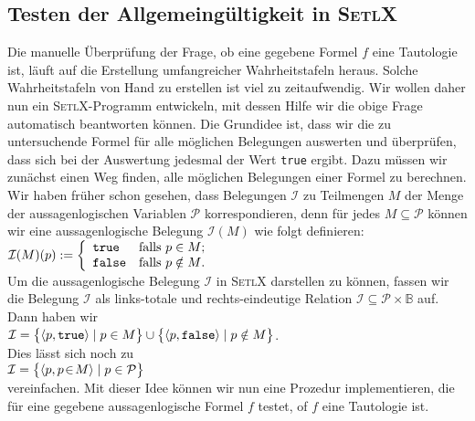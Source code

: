 \subsection{Testen der Allgemeing\"{u}ltigkeit in \textsc{SetlX}}
\noindent
 Die manuelle \"{U}berpr\"{u}fung der Frage, ob eine gegebene Formel $f$ eine Tautologie ist, 
l\"{a}uft auf die Erstellung umfangreicher Wahrheitstafeln heraus.   Solche Wahrheitstafeln
von Hand zu erstellen ist viel zu zeitaufwendig. 
Wir wollen daher nun ein \textsc{SetlX}-Programm entwickeln, mit dessen Hilfe wir die
obige Frage automatisch beantworten k\"{o}nnen.   Die Grundidee ist, dass wir die zu untersuchende
Formel f\"{u}r alle m\"{o}glichen Belegungen auswerten und \"{u}berpr\"{u}fen, dass sich bei der Auswertung
jedesmal der Wert \texttt{true} ergibt.  Dazu m\"{u}ssen wir zun\"{a}chst einen Weg finden, alle
m\"{o}glichen Belegungen einer Formel zu berechnen.  Wir haben fr\"{u}her schon gesehen, dass
Belegungen $\mathcal{I}$ zu Teilmengen $M$ der Menge der aussagenlogischen Variablen
$\mathcal{P}$ korrespondieren, denn f\"{u}r jedes $M \subseteq \mathcal{P}$ k\"{o}nnen wir eine
aussagenlogische Belegung $\mathcal{I}(M)$ wie folgt definieren:
\\[0.2cm]
\hspace*{1.3cm}
$\mathcal{I}(M)(p) := \left\{
\begin{array}[c]{ll}
  \texttt{true}  & \mbox{falls $p \in M$;} \\
  \texttt{false} & \mbox{falls $p \notin M$.}
\end{array}
\right.
$
\\[0.2cm]
Um die aussagenlogische Belegung $\mathcal{I}$ in \textsc{SetlX} darstellen zu k\"{o}nnen,
fassen wir die Belegung $\mathcal{I}$ als links-totale und rechts-eindeutige Relation
$\mathcal{I} \subseteq \mathcal{P} \times \mathbb{B}$ auf.  Dann haben wir
\\[0.2cm]
\hspace*{1.3cm}
$\mathcal{I} = \bigl\{ \pair(p, \texttt{true} ) \mid p \in    M \bigr\} \cup 
               \bigl\{ \pair(p, \texttt{false}) \mid p \notin M \bigr\}
$.
\\[0.2cm]
Dies l\"{a}sst sich noch zu
\\[0.2cm]
\hspace*{1.3cm}
$\mathcal{I} = \bigl\{ \langle p, p \!\in\! M\rangle \mid  p \in \mathcal{P} \bigr\}$
\\[0.2cm]
vereinfachen.  Mit dieser Idee k\"{o}nnen wir nun eine Prozedur implementieren, die f\"{u}r eine
gegebene aussagenlogische Formel $f$ testet, of $f$ eine Tautologie ist.

